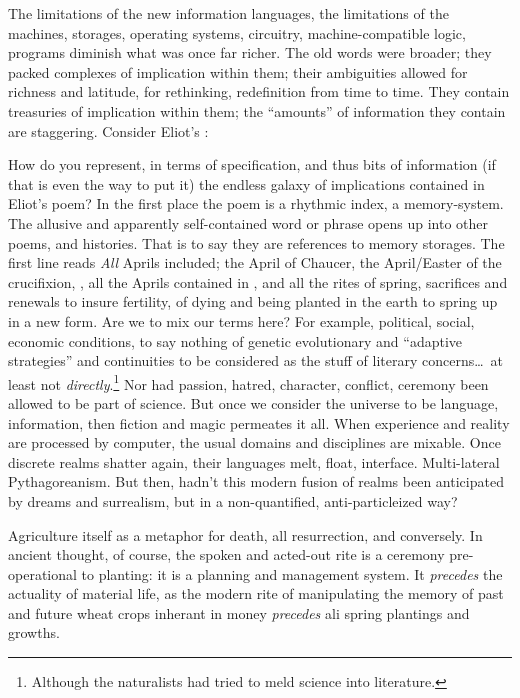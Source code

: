 \documentclass[11pt,twoside,draft]{memoir}
\begin{document}
The limitations of the new information
languages, the limitations of the machines,
storages, operating systems, circuitry, machine-compatible logic, programs diminish
what was once far richer. The old words
were broader; they packed complexes of
implication within them; their ambiguities
allowed for richness and latitude, for rethinking, redefinition from time to time.
They contain treasuries of implication within them; the \enquote{amounts} of information they
contain are staggering. Consider Eliot's :

How do you represent, in terms of specification, and thus bits of information (if that
is even the way to put it) the endless galaxy of implications contained in Eliot's poem?
In the first place the poem is a rhythmic index, a memory-system. The allusive and
apparently self-contained word or phrase opens up into other poems, and histories.
That is to say they are references to memory
storages. The first line reads  
\emph{All} Aprils included;
the April of Chaucer, the April/Easter of the
crucifixion, , all the
Aprils contained in , and
all the rites of spring, sacrifices and renewals
to insure fertility, of dying and being planted
in the earth to spring up in a new form. Are
we to mix our terms here? For example,
political, social, economic conditions, to say
nothing of genetic evolutionary and \enquote{adaptive strategies} 
and continuities to be considered as the stuff of literary concerns\ldots\ at
least not \emph{directly}.\footnote{Although the naturalists had tried to meld science into literature.}
Nor had passion, hatred, character, conflict,
ceremony been allowed to be part of science.
But once we consider the universe to be
language, information, then fiction and
magic permeates it all. When experience and
reality are processed by computer, the usual
domains and disciplines are mixable. Once
discrete realms shatter again, their languages
melt, float, interface. Multi-lateral Pythagoreanism. But then, hadn't this modern fusion
of realms been anticipated by dreams and surrealism,
but in a non-quantified, anti-particleized way?

Agriculture itself as a metaphor for death,
all resurrection, and conversely. In ancient
thought, of course, the spoken and acted-out
rite is a ceremony pre-operational to planting: it is a planning and management 
system. It \emph{precedes} the actuality of material life, as the modern rite of manipulating the memory of past and future wheat crops inherant
in money \emph{precedes} ali spring plantings and
growths.
\end{document}
